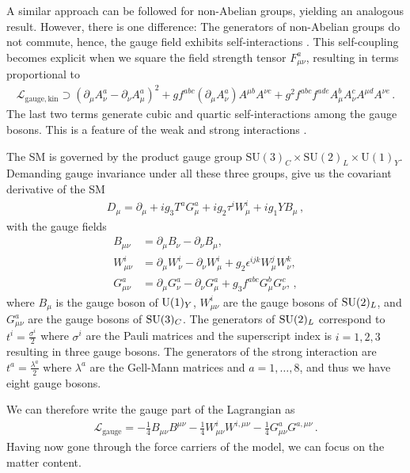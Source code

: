  A similar approach can be followed for non-Abelian groups, yielding an analogous result. However, there is one difference: The generators of non-Abelian groups do not commute, hence, the gauge field exhibits self-interactions \cite{Yang:1954ek}. This self-coupling becomes explicit when we square the field strength tensor $F^a_{\mu\nu}$, resulting in terms proportional to
\begin{align}
    \mathcal{L}_{\mathrm{gauge,kin}}\supset (\partial_\mu A^a_\nu-\partial_\nu A^a_\mu)^2+gf^{abc}(\partial_\mu A^a_\nu)A^{\mu b}A^{\nu c}+g^2 f^{abc} f^{ade}A_{\mu}^{b}A_{\nu}^{c}A^{\mu d}A^{\nu e}\,.
\end{align}
The last two terms generate cubic and quartic self-interactions among the gauge bosons. This is a feature of the weak and strong interactions \cite{Pernow:2021fvb}. 

The SM is governed by the product gauge group $\mathrm{SU}(3)_C\times\mathrm{SU}(2)_L\times\mathrm{U}(1)_Y$. Demanding gauge invariance under all these three groups, give us the covariant derivative of the SM
\begin{align}
    D_\mu = \partial_\mu + ig_3 T^a G^a_\mu + ig_2 \tau^i W^i_\mu + ig_1 Y B_\mu\,,\label{eq:CovarD}
\end{align}
with the gauge fields
\begin{align}
    B_{\mu\nu} &= \partial_\mu B_\nu - \partial_\nu B_\mu, \\
    W_{\mu\nu}^i &= \partial_\mu W_\nu^i - \partial_\nu W_\mu^i + g_2 \epsilon^{ijk} W_\mu^j W_\nu^k, \\
    G_{\mu\nu}^a &= \partial_\mu G_\nu^a - \partial_\nu G_\mu^a + g_3 f^{abc} G_\mu^b G_\nu^c,\,,
\end{align}
where $B_\mu$ is the gauge boson of $\mathrm{U}(1)_Y$, $W_{\mu\nu}^i$ are the gauge bosons of $\mathrm{SU}(2)_L$, and $G_{\mu\nu}^a$ are the gauge bosons of $\mathrm{SU}(3)_C$. The generators of $\mathrm{SU}(2)_L$ correspond to $t^i=\frac{\sigma^i}{2}$ where $\sigma^i$ are the Pauli matrices and the superscript index is $i=1,2,3$ resulting in three gauge bosons. The generators of the strong interaction are $t^a=\frac{\lambda^a}{2}$ where $\lambda^a$ are the Gell-Mann matrices and $a=1,\dots,8$, and thus we have eight gauge bosons.

We can therefore write the gauge part of the Lagrangian as 
\begin{align}
    \mathcal{L}_{\mathrm{gauge}} = -\frac{1}{4} B_{\mu\nu} B^{\mu\nu} - \frac{1}{4} W_{\mu\nu}^i W^{i,\mu\nu} - \frac{1}{4} G_{\mu\nu}^a G^{a,\mu\nu}\,. \label{eq:LGauge}
\end{align}
Having now gone through the force carriers of the model, we can focus on the matter content.


